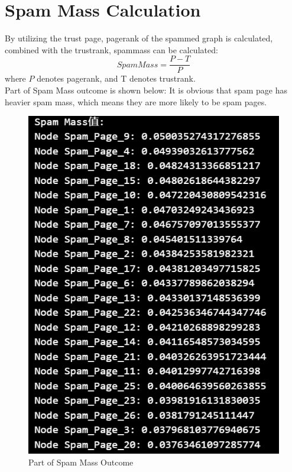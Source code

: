 \documentclass{article}
\begin{document}
	\section*{Spam Mass Calculation}
	By utilizing the trust page, pagerank of the spammed graph is calculated, combined with the trustrank, spammass can be calculated:
	$$Spam Mass = \frac{P-T}{P}$$
	where $P$ denotes pagerank, and T denotes trustrank.\\
	Part of Spam Mass outcome is shown below: It is obvious that spam page has heavier spam mass, which means they are more likely to be spam pages.
	\begin{figure}[H]
		\centering
		\includegraphics[scale=0.5]{spammass.png}
		\caption{Part of Spam Mass Outcome}
	\end{figure}
	
	
\end{document}
